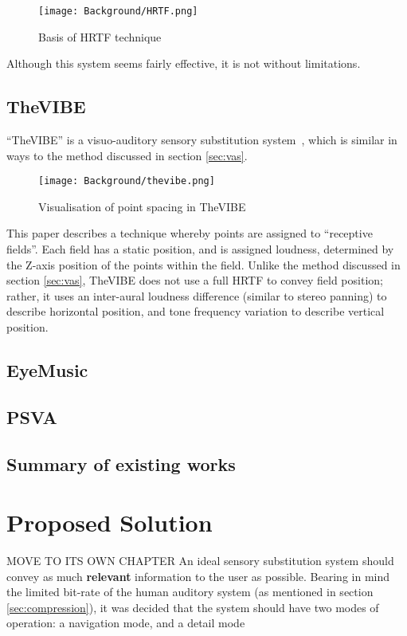 \begin{figure}[H]
    \centering
    \texttt{[image: Background/HRTF.png]}
    \caption{Basis of HRTF technique~\cite{hrtf-diagram}}
\end{figure}

Although this system seems fairly effective, it is not without limitations.  

\subsection{TheVIBE}
``TheVIBE'' is a visuo-auditory sensory substitution system~\cite{thevibe}, which is similar in ways to the method discussed in section \ref{sec:vas}.

\begin{figure}[H]
    \centering
    \texttt{[image: Background/thevibe.png]}
    \caption{Visualisation of point spacing in TheVIBE}
\end{figure}

This paper describes a technique whereby points are assigned to ``receptive fields''. Each field has a static position, and is assigned loudness, determined by the Z-axis position of the points within the field. Unlike the method discussed in section \ref{sec:vas}, TheVIBE does not use a full \ac{HRTF} to convey field position; rather, it uses an inter-aural loudness difference (similar to stereo panning) to describe horizontal position, and tone frequency variation to describe vertical position.

\subsection{EyeMusic}
\subsection{PSVA}

\subsection{Summary of existing works}

\section{Proposed Solution}
MOVE TO ITS OWN CHAPTER
An ideal sensory substitution system should convey as much \textbf{relevant} information to the user as possible. Bearing in mind the limited bit-rate of the human auditory system (as mentioned in section \ref{sec:compression}), it was decided that the system should have two modes of operation: a navigation mode, and a detail mode

